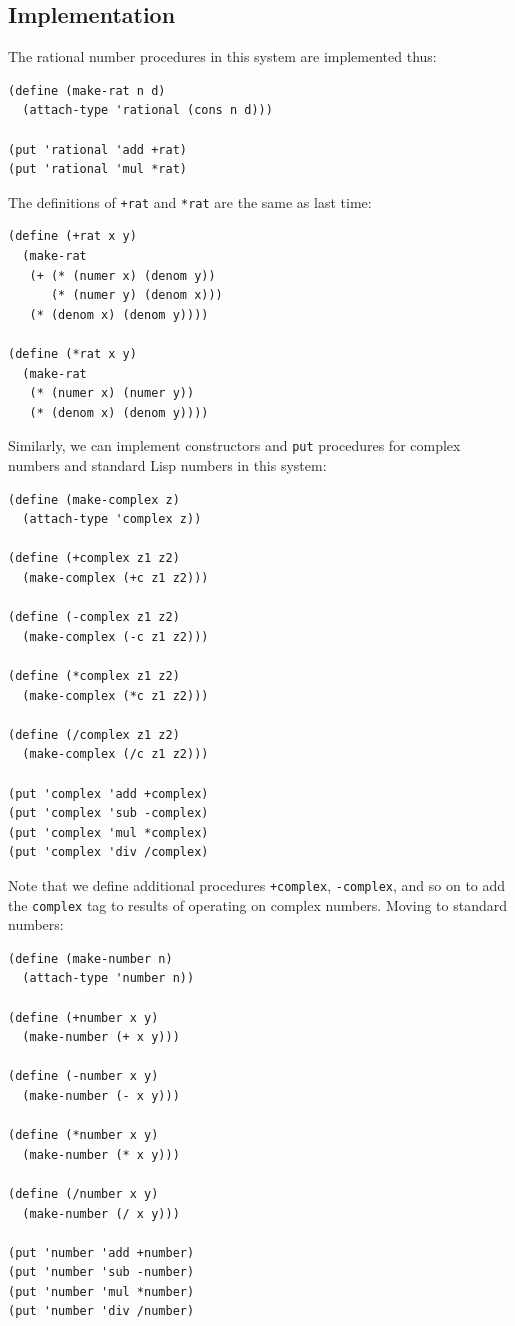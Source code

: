 \documentclass[9pt]{report}
\begin{document}
\subsection{Implementation}
\label{sec:orgf4a6027}

The rational number procedures in this system are implemented thus:

\begin{verbatim}
(define (make-rat n d)
  (attach-type 'rational (cons n d)))

(put 'rational 'add +rat)
(put 'rational 'mul *rat)
\end{verbatim}

The definitions of \texttt{+rat} and \texttt{*rat} are the same as last time:
\begin{verbatim}
(define (+rat x y)
  (make-rat
   (+ (* (numer x) (denom y))
      (* (numer y) (denom x)))
   (* (denom x) (denom y))))

(define (*rat x y)
  (make-rat
   (* (numer x) (numer y))
   (* (denom x) (denom y))))
\end{verbatim}

Similarly, we can implement constructors and \texttt{put} procedures for
complex numbers and standard Lisp numbers in this system:

\begin{verbatim}
(define (make-complex z)
  (attach-type 'complex z))

(define (+complex z1 z2)
  (make-complex (+c z1 z2)))

(define (-complex z1 z2)
  (make-complex (-c z1 z2)))

(define (*complex z1 z2)
  (make-complex (*c z1 z2)))

(define (/complex z1 z2)
  (make-complex (/c z1 z2)))

(put 'complex 'add +complex)
(put 'complex 'sub -complex)
(put 'complex 'mul *complex)
(put 'complex 'div /complex)
\end{verbatim}

Note that we define additional procedures \texttt{+complex}, \texttt{-complex},
and so on to add the \texttt{complex} tag to results of operating on
complex numbers. Moving to standard numbers:

\begin{verbatim}
(define (make-number n)
  (attach-type 'number n))

(define (+number x y)
  (make-number (+ x y)))

(define (-number x y)
  (make-number (- x y)))

(define (*number x y)
  (make-number (* x y)))

(define (/number x y)
  (make-number (/ x y)))

(put 'number 'add +number)
(put 'number 'sub -number)
(put 'number 'mul *number)
(put 'number 'div /number)
\end{verbatim}
\end{document}
